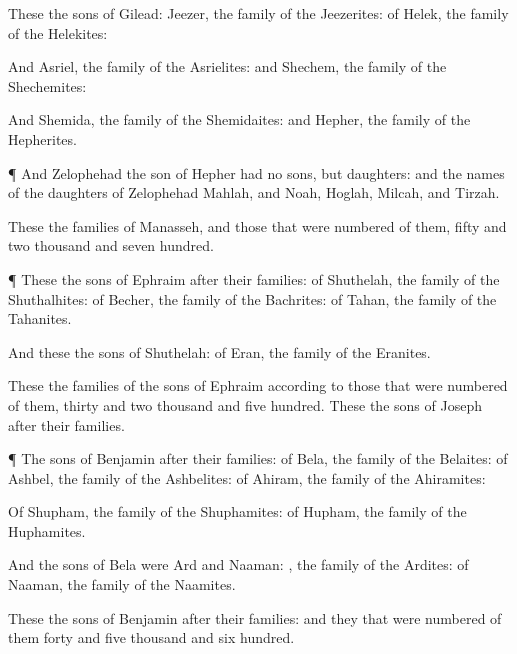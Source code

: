 {These
{} the
sons of
Gilead:
{}
Jeezer, the
family of the
Jeezerites: of
Helek, the
family of the
Helekites:

And
{}
Asriel, the
family of the
Asrielites: and
{}
Shechem, the
family of the
Shechemites:

And
{}
Shemida, the
family of the
Shemidaites: and
{}
Hepher, the
family of the
Hepherites.


\par }{\PP {}¶ And
Zelophehad the
son of
Hepher had no
sons, but
daughters: and the
names of the
daughters of
Zelophehad
{}
Mahlah, and
Noah,
Hoglah,
Milcah, and
Tirzah.

These
{} the
families of
Manasseh, and those that were
numbered of them,
fifty and
two
thousand and
seven
hundred.


\par }{\PP {}¶ These
{} the
sons of
Ephraim after their
families: of
Shuthelah, the
family of the
Shuthalhites: of
Becher, the
family of the
Bachrites: of
Tahan, the
family of the
Tahanites.

And these
{} the
sons of
Shuthelah: of
Eran, the
family of the
Eranites.

These
{} the
families of the
sons of
Ephraim according to those that were
numbered of them,
thirty and
two
thousand and
five
hundred. These
{} the
sons of
Joseph after their
families.


\par }{\PP {}¶ The
sons of
Benjamin after their
families: of
Bela, the
family of the
Belaites: of
Ashbel, the
family of the
Ashbelites: of
Ahiram, the
family of the
Ahiramites:

Of
Shupham, the
family of the
Shuphamites: of
Hupham, the
family of the
Huphamites.

And the
sons of
Bela were
Ard and
Naaman:
{}, the
family of the
Ardites:
{} of
Naaman, the
family of the
Naamites.

These
{} the
sons of
Benjamin after their
families: and they that were
numbered of them
{}
forty and
five
thousand and
six
hundred.


}
